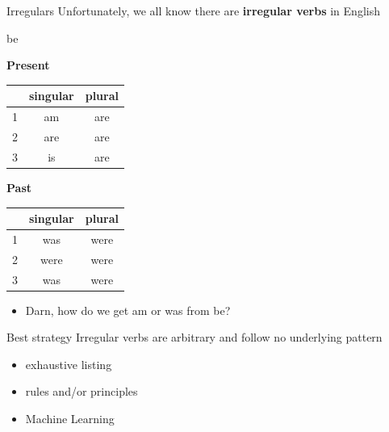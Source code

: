 \documentclass[10pt, compress]{beamer}		%
\begin{document}
\begin{frame}{Irregulars}
	Unfortunately, we all know there are {\bf irregular verbs} in English

	\begin{table}
		{\sc be} \\
		\begin{multicols}{2}

			{\bf Present}	\\
			\begin{tabular}{|r|cc|}
				\toprule
					&	singular	&	plural	\\
				\midrule
				1	&	am 	&	are 	\\
				2	&	are 	&	are 	\\
				3	&	is &	are 	\\
				\bottomrule
			\end{tabular}

			{\bf Past}	\\
			\begin{tabular}{|r|cc|}
				\toprule
					&	singular	&	plural	\\
				\midrule
				1	&	was 	&	were 	\\
				2	&	were 	&	were 	\\
				3	&	was &	were 	\\
				\bottomrule
			\end{tabular}
		\end{multicols}
	\end{table}

	\pause

	\begin{itemize}
		\item Darn, how do we get \alert{am} or \alert{was} from \alert{be}?
	\end{itemize}
\end{frame}

\begin{frame}{Best strategy}
	Irregular verbs are arbitrary and follow no underlying pattern
	\pause
	\begin{itemize}
		\item exhaustive listing
		\item rules and/or principles
		\item Machine Learning
	\end{itemize}

\end{frame}
\end{document}
